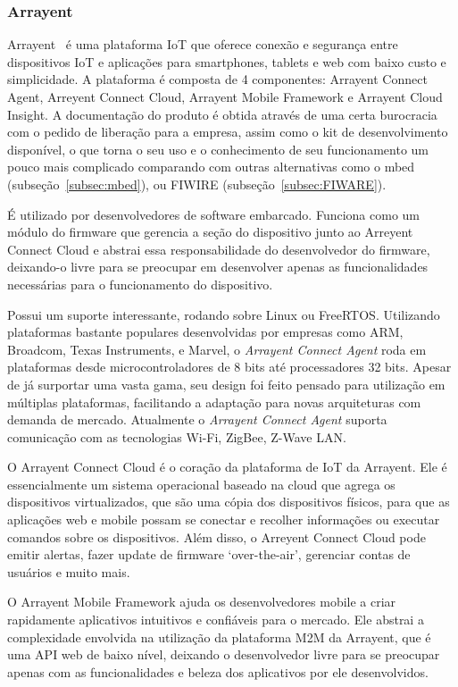 \subsubsection{Arrayent}
Arrayent~\cite{arrayent} é uma plataforma IoT que oferece conexão e segurança entre dispositivos IoT e aplicações
para  smartphones, tablets e web com baixo custo e simplicidade. A plataforma é composta de 4 componentes:
Arrayent Connect Agent, Arreyent Connect Cloud, Arrayent Mobile Framework e Arrayent Cloud Insight.
A documentação do produto é obtida através de uma certa burocracia com o pedido de liberação para
a empresa, assim como o kit de desenvolvimento disponível, o que torna o seu uso e o
conhecimento de seu funcionamento um pouco mais complicado comparando com outras alternativas como o
mbed (subseção~\ref{subsec:mbed}), ou FIWIRE (subseção~\ref{subsec:FIWARE}).

É utilizado por desenvolvedores de software embarcado. Funciona como um módulo do firmware que gerencia a
seção do dispositivo junto ao Arreyent Connect Cloud e abstrai essa responsabilidade do desenvolvedor
do firmware, deixando-o livre para se preocupar em desenvolver apenas as funcionalidades necessárias para o
funcionamento do dispositivo.

Possui um suporte interessante, rodando sobre Linux ou FreeRTOS. Utilizando plataformas bastante populares
desenvolvidas por empresas como ARM, Broadcom, Texas Instruments, e Marvel, o \textit{Arrayent Connect Agent} roda
em plataformas desde microcontroladores de 8 bits até processadores 32 bits. Apesar de já surportar
uma vasta gama, seu design foi feito pensado para utilização em múltiplas plataformas, facilitando a
adaptação para novas arquiteturas com demanda de mercado. Atualmente o \textit{Arrayent Connect Agent}
suporta comunicação com as tecnologias Wi-Fi, ZigBee, Z-Wave LAN.

O Arrayent Connect Cloud é o coração da plataforma de IoT da Arrayent. Ele é essencialmente um sistema
operacional baseado na cloud que agrega os dispositivos virtualizados, que são uma cópia dos dispositivos
físicos, para que as aplicações web e mobile possam se conectar e recolher informações ou executar comandos
sobre os dispositivos. Além disso, o Arreyent Connect Cloud pode emitir alertas, fazer update de firmware
\lq over-the-air\rq, gerenciar contas de usuários e muito mais.

O Arrayent Mobile Framework ajuda os desenvolvedores mobile a criar rapidamente aplicativos intuitivos e
confiáveis para o mercado. Ele abstrai a complexidade envolvida na utilização da plataforma M2M da Arrayent,
que é uma API web de baixo nível, deixando o desenvolvedor livre para se preocupar apenas com as funcionalidades
e beleza dos aplicativos por ele desenvolvidos.

